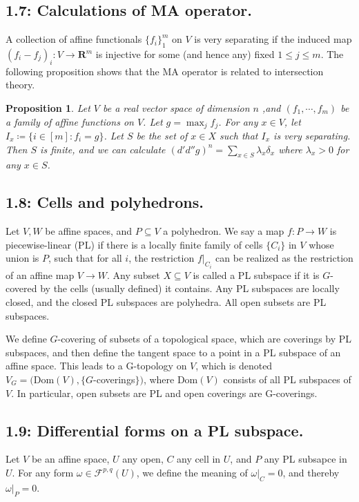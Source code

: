 \documentclass[12pt,reqno]{amsart}
\newtheorem{proposition}[theorem]{Proposition}
\theoremstyle{definition}
\theoremstyle{remark}
\theoremstyle{citedrem}
\theoremstyle{cited}
\theoremstyle{citeddef}
\theoremstyle{step}
\begin{document}
\subsection*{1.7: Calculations of MA operator.} A collection of affine functionals $\{f_i\}_1^m$ on $V$ is very separating if the induced map $(f_i - f_j)_i \colon V \to \mathbf{R}^m$ is injective for some (and hence any) fixed $1 \leq j \leq m$. The following proposition shows that the MA operator is related to intersection theory. 

\begin{proposition}
    Let $V$ be a real vector space of dimension $n$ ,and $(f_1, \cdots, f_m)$ be a family of affine functions on $V$. Let $g = \max_j f_j$. For any $x \in V$, let $I_x \coloneqq \{i \in [m] \colon f_i = g\}$. Let $S$ be the set of $x \in X$ such that $I_x$ is very separating. Then $S$ is finite, and we can calculate $(d'd''g)^n = \sum_{x \in S} \lambda_x \delta_x$ where $\lambda_x > 0$ for any $x \in S$. 
\end{proposition}

\subsection*{1.8: Cells and polyhedrons.}
Let $V, W$ be affine spaces, and $P \subseteq V$ a polyhedron. We say a map $f\colon P \to W$ is piecewise-linear (PL) if there is a locally finite family of cells $\{C_i\}$ in $V$ whose union is $P$, such that for all $i$, the restriction $f|_{C_i}$ can be realized as the restriction of an affine map $V \to W$. Any subset $X \subseteq V$ is called a PL subspace if it is $G$-covered by the cells (usually defined) it contains. Any PL subspaces are locally closed, and the closed PL subspaces are polyhedra. All open subsets are PL subspaces. 

We define $G$-covering of subsets of a topological space, which are coverings by PL subspaces, and then define the tangent space to a point in a PL subspace of an affine space. This leads to a G-topology on $V$, which is denoted $V_G = (\mathrm{Dom}(V), \{G$-coverings$\})$, where $\mathrm{Dom}(V)$ consists of all PL subspaces of $V$. In particular, open subsets are PL and open coverings are G-coverings.

\subsection*{1.9: Differential forms on a PL subspace.} Let $V$ be an affine space, $U$ any open, $C$ any cell in $U$, and $P$ any PL subsapce in $U$. For any form $\omega \in \mathcal{F}^{p,q}(U)$, we define the meaning of $\omega|_C = 0$, and thereby $\omega|_P = 0$.
\end{document}
